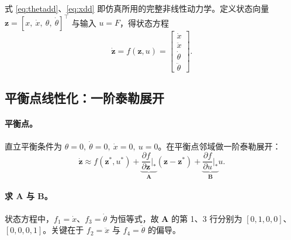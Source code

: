 \documentclass[11pt,a4paper]{article}
\begin{document}
式 \eqref{eq:thetadd}、\eqref{eq:xdd} 即仿真所用的完整非线性动力学。定义状态向量 $\mathbf z = [x,\ \dot x,\ \theta,\ \dot\theta]^{\top}$ 与输入 $u = F$，得状态方程
\begin{equation}
    \dot{\mathbf z} = f(\mathbf z, u)
    = \begin{bmatrix} \dot x \\ \ddot x \\ \dot\theta \\ \ddot\theta \end{bmatrix} .
\end{equation}

\subsection{平衡点线性化：一阶泰勒展开}

\paragraph{平衡点。} 直立平衡条件为 $\theta = 0,\ \dot\theta = 0,\ \dot x = 0,\ u = 0$。在平衡点邻域做一阶泰勒展开：
\begin{equation}
    \dot{\mathbf z} \approx f(\mathbf z^*, u^*) + \underbrace{\frac{\partial f}{\partial \mathbf z}\Big|_{*}}_{\mathbf A}(\mathbf z - \mathbf z^*) + \underbrace{\frac{\partial f}{\partial u}\Big|_{*}}_{\mathbf B} u .
\end{equation}

\paragraph{求 \texorpdfstring{$\mathbf A$}{A} 与 \texorpdfstring{$\mathbf B$}{B}。} 状态方程中，$f_1 = \dot x$、$f_3 = \dot\theta$ 为恒等式，故 $\mathbf A$ 的第 1、3 行分别为 $[0,1,0,0]$、$[0,0,0,1]$。关键在于 $f_2 = \ddot x$ 与 $f_4 = \ddot\theta$ 的偏导。
\end{document}

